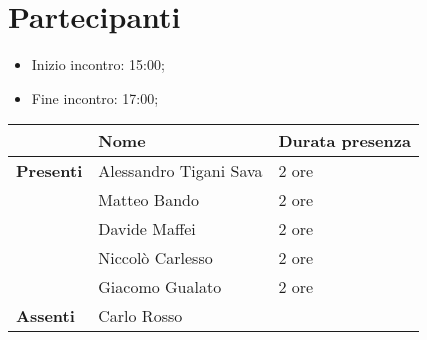 \section{Partecipanti}

\begin{itemize}
    \item Inizio incontro: 15:00;
    \item Fine incontro: 17:00;
\end{itemize}


\begin{center}
	{\renewcommand{\arraystretch}{1.5}
	\begin{tabular}{lll}
							& \textbf{Nome}  & \textbf{Durata presenza} \\
		\hline
		\textbf{Presenti}   & Alessandro Tigani Sava 	& 2 ore     \\
							& Matteo Bando				& 2 ore		\\
							& Davide Maffei				& 2 ore		\\
							& Niccolò Carlesso			& 2 ore		\\
							& Giacomo Gualato			& 2 ore		\\
		\hline
		\textbf{Assenti}	& Carlo Rosso				& 			\\
	\end{tabular}	
	}
	\end{center}